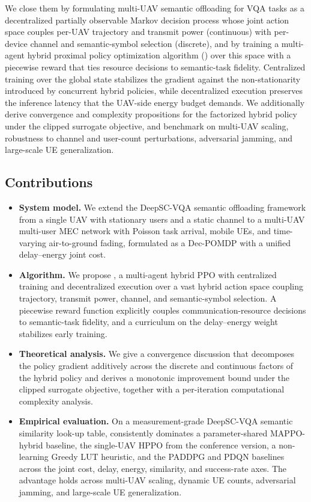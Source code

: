 We close them by formulating multi-UAV semantic offloading for VQA tasks as
a decentralized partially observable Markov decision process whose joint
action space couples per-UAV trajectory and transmit power (continuous)
with per-device channel and semantic-symbol selection (discrete), and by
training a multi-agent hybrid proximal policy optimization algorithm
(\method) over this space with a piecewise reward that ties resource
decisions to semantic-task fidelity. Centralized training over the global
state stabilizes the gradient against the non-stationarity introduced by
concurrent hybrid policies, while decentralized execution preserves the
inference latency that the UAV-side energy budget demands. We additionally
derive convergence and complexity propositions for the factorized hybrid
policy under the clipped surrogate objective, and benchmark \method on
multi-UAV scaling, robustness to channel and user-count perturbations,
adversarial jamming, and large-scale UE generalization.

\subsection*{Contributions}
\begin{itemize}
  \item \textbf{System model.} We extend the DeepSC-VQA semantic offloading
    framework from a single UAV with stationary users and a static channel
    to a multi-UAV multi-user MEC network with Poisson task arrival, mobile
    UEs, and time-varying air-to-ground fading, formulated as a Dec-POMDP
    with a unified delay--energy joint cost.
  \item \textbf{Algorithm.} We propose \method, a multi-agent hybrid PPO
    with centralized training and decentralized execution over a vast
    hybrid action space coupling trajectory, transmit power, channel, and
    semantic-symbol selection. A piecewise reward function explicitly
    couples communication-resource decisions to semantic-task fidelity, and
    a curriculum on the delay--energy weight stabilizes early training.
  \item \textbf{Theoretical analysis.} We give a convergence discussion
    that decomposes the policy gradient additively across the discrete and
    continuous factors of the hybrid policy and derives a monotonic
    improvement bound under the clipped surrogate objective, together with
    a per-iteration computational complexity analysis.
  \item \textbf{Empirical evaluation.} On a measurement-grade DeepSC-VQA
    semantic similarity look-up table, \method consistently dominates a
    parameter-shared MAPPO-hybrid baseline, the single-UAV HPPO from the
    conference version, a non-learning Greedy LUT heuristic, and the
    PADDPG and PDQN baselines across the
    joint cost, delay, energy, similarity, and success-rate axes. The
    advantage holds across multi-UAV scaling, dynamic UE counts,
    adversarial jamming, and large-scale UE generalization.
\end{itemize}

